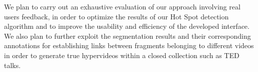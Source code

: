 \documentclass{llncs}
\begin{document}
We plan to carry out an exhaustive evaluation of our approach involving real users feedback, in order to optimize the results of our Hot Spot detection algorithm and to improve the usability and efficiency of the developed interface. We also plan to further exploit the segmentation results and their corresponding annotations for establishing links between fragments belonging to different videos in order to generate true hypervideos within a closed collection such as TED talks.





\end{document}
